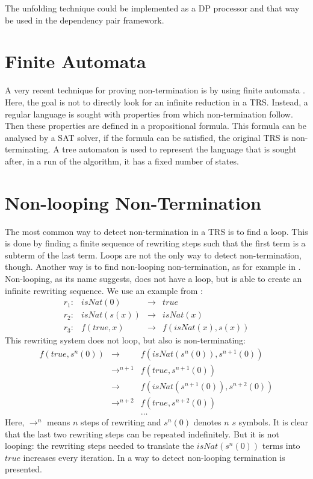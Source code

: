 The unfolding technique could be implemented as a DP processor and that way be used in the dependency pair framework. 
\section{Finite Automata}
A very recent technique for proving non-termination is by using finite automata \cite{ENDRULLIS:AUTOMATA}. Here, the goal is not to directly look for an infinite reduction in a TRS. Instead, a regular language is sought with properties from which non-termination follow. Then these properties are defined in a propositional formula. This formula can be analysed by a SAT solver, if the formula can be satisfied, the original TRS is non-terminating. A tree automaton is used to represent the language that is sought after, in a run of the algorithm, it has a fixed number of states. 

\section{Non-looping Non-Termination}
The most common way to detect non-termination in a TRS is to find a loop. This is done by finding a finite sequence of rewriting steps such that the first term is a subterm of the last term. Loops are not the only way to detect non-termination, though. Another way is to find non-looping non-termination, as for example in \cite{emmes2012detecting}. Non-looping, as its name suggests, does not have a loop, but is able to create an infinite rewriting sequence. We use an example from \cite{emmes2012detecting}:
\[
\begin{array}{lrcl}
    r_1: & isNat(0) & \rightarrow & true \\
    r_2: & isNat(s(x)) & \rightarrow & isNat(x) \\
    r_3: & f(true, x) & \rightarrow & f(isNat(x), s(x))
\end{array}
\]
This rewriting system does not loop, but also is non-terminating:
\[
\begin{array}{lll}
f(true, s^n(0)) & \rightarrow       & f(isNat(s^n(0)), s^{n+1}(0)) \\
                & \rightarrow^{n+1} & f(true, s^{n+1}(0)) \\
                & \rightarrow       & f(isNat(s^{n+1}(0)), s^{n+2}(0)) \\
                & \rightarrow^{n+2} & f(true, s^{n+2}(0)) \\
                &                   & \dots
\end{array}
\]
Here, $\rightarrow^n$ means $n$ steps of rewriting and $s^{n}(0)$ denotes $n$ $s$ symbols. It is clear that the last two rewriting steps can be repeated indefinitely. But it is not looping: the rewriting steps needed to translate the $isNat(s^{n}(0))$ terms into $true$ increases every iteration. In \cite{emmes2012detecting} a way to detect non-looping termination is presented. 

